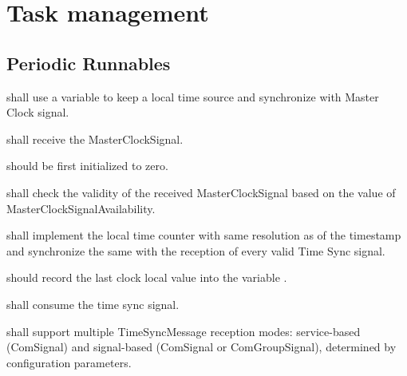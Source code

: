 \section{Task management}

\subsection{Periodic Runnables}
\label{sec:periodic_runnables}

{ shall use a variable  to keep a local time source and synchronize with Master Clock signal.}
{}

{ shall receive the MasterClockSignal.}
{ }

{ should be first initialized to zero.}
{}

{ shall check the validity of the received MasterClockSignal based on the value of MasterClockSignalAvailability.}
{}

{ shall implement the local time counter with same resolution as of the timestamp and synchronize the same with the reception of every valid Time Sync signal.}
{ }

{ should record the last clock local value into the variable .}
{}

{ shall consume the time sync signal.}
{}

{ shall support multiple TimeSyncMessage reception modes: service-based (ComSignal) and signal-based (ComSignal or ComGroupSignal), determined by configuration parameters.}
{}

